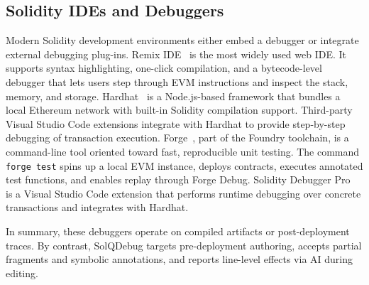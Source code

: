 \documentclass[pdflatex,sn-basic]{sn-jnl}%
\theoremstyle{thmstyleone}%
\theoremstyle{thmstyletwo}%
\theoremstyle{thmstylethree}%
\begin{document}
    \subsection{Solidity IDEs and Debuggers}
        Modern Solidity development environments either embed a debugger or integrate external
        debugging plug-ins. Remix IDE~\citep{remix} is the most widely used web IDE. It supports syntax
        highlighting, one-click compilation, and a bytecode-level debugger that lets users step
        through EVM instructions and inspect the stack, memory, and storage. Hardhat~\citep{hardhat}
        is a Node.js-based framework that bundles a local Ethereum network with built-in Solidity compilation support. Third-party Visual Studio Code extensions integrate with Hardhat to provide step-by-step debugging of transaction execution. Forge~\citep{forge}, part of the Foundry toolchain, is a command-line tool oriented toward fast,
        reproducible unit testing. The command \texttt{forge test} spins up a local EVM instance,
        deploys contracts, executes annotated test functions, and enables replay through Forge Debug.
        Solidity Debugger Pro~\citep{soldepro} is a Visual Studio Code extension that performs runtime debugging over
        concrete transactions and integrates with Hardhat.

        In summary, these debuggers operate on compiled artifacts or post-deployment traces.
        By contrast, SolQDebug targets pre-deployment authoring, accepts partial fragments
        and symbolic annotations, and reports line-level effects via AI during
        editing.
\end{document}

